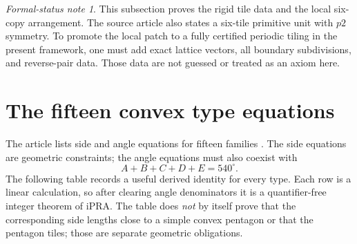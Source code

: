 \documentclass[11pt]{article}
\theoremstyle{remark}
\newtheorem{status}[theorem]{Formal-status note}
\newcommand{\ipra}{\mathrm{iPRA}}
\begin{document}
\begin{status}
This subsection proves the rigid tile data and the local six-copy arrangement.
The source article also states a six-tile primitive unit with \(p2\) symmetry.
To promote the local patch to a fully certified periodic tiling in the present
framework, one must add exact lattice vectors, all boundary subdivisions, and
reverse-pair data.  Those data are not guessed or treated as an axiom here.
\end{status}

\section{The fifteen convex type equations}
\label{sec:fifteen}

The article lists side and angle equations for fifteen families
\cite{WikipediaPentagonal}.  The side equations are geometric constraints;
the angle equations must also coexist with
\[
 A+B+C+D+E=540^\circ.
\]
The following table records a useful derived identity for every type.  Each
row is a linear calculation, so after clearing angle denominators it is a
quantifier-free integer theorem of \(\ipra\).  The table does \emph{not} by
itself prove that the corresponding side lengths close to a simple convex
pentagon or that the pentagon tiles; those are separate geometric obligations.
\end{document}
